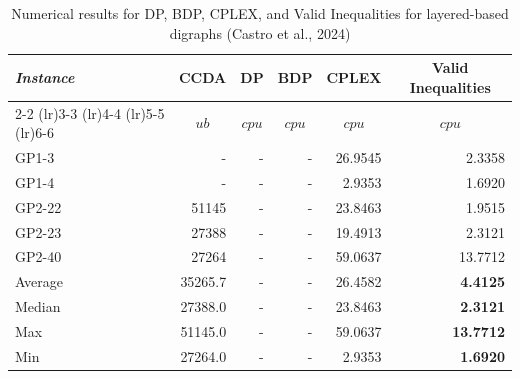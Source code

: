 \documentclass[pdflatex,sn-mathphys-num]{sn-jnl}
\begin{document}
\begin{table}[htbp]
\centering
\caption{Numerical results for DP, BDP, CPLEX, and Valid Inequalities for layered-based digraphs (Castro et al., 2024)}
\label{tab:numerical_results_castro}
\begin{tabular*}{\textwidth}{l@{\extracolsep{\fill}}rrrrr}
\toprule
\textit{Instance} & \multicolumn{1}{c}{CCDA} & \multicolumn{1}{c}{DP} & \multicolumn{1}{c}{BDP} & \multicolumn{1}{c}{CPLEX} & \multicolumn{1}{c}{Valid Inequalities} \\
\cmidrule(lr){2-2} \cmidrule(lr){3-3} \cmidrule(lr){4-4} \cmidrule(lr){5-5} \cmidrule(lr){6-6}
 & \multicolumn{1}{c}{$ub$} & \multicolumn{1}{c}{$cpu$} & \multicolumn{1}{c}{$cpu$} & \multicolumn{1}{c}{$cpu$} & \multicolumn{1}{c}{$cpu$} \\
\midrule
GP1-3 & - & - & - & 26.9545 & 2.3358 \\
GP1-4 & - & - & - & 2.9353 & 1.6920 \\
GP2-22 & 51145 & - & - & 23.8463 & 1.9515 \\
GP2-23 & 27388 & - & - & 19.4913 & 2.3121 \\
GP2-40 & 27264 & - & - & 59.0637 & 13.7712 \\
\midrule
Average & 35265.7 & - & - & 26.4582 & \textbf{4.4125} \\
Median & 27388.0 & - & - & 23.8463 & \textbf{2.3121} \\
Max & 51145.0 & - & - & 59.0637 & \textbf{13.7712} \\
Min & 27264.0 & - & - & 2.9353 & \textbf{1.6920} \\
\bottomrule
\end{tabular*}
\end{table}
\end{document}
